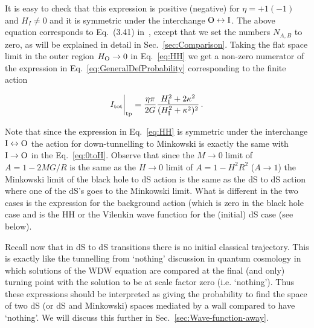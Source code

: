 \documentclass[11pt,a4paper]{article}
\begin{document}
It is easy to check that this expression is positive (negative) for $\eta = +1(-1)$ and $H_{I} \neq 0$ and it is symmetric under the interchange ${\rm O}\leftrightarrow {\rm I}$. The above equation corresponds to Eq.~(3.41) in~\cite{Bachlechner:2016mtp}, except that we set the numbers $N_{A,B}$ to zero, as will be explained in detail in Sec.~\ref{sec:Comparison}. Taking the flat space limit in the outer region $H_{\rm O} \rightarrow 0$ in Eq.~\eqref{eq:HH} we get a non-zero numerator of the expression in Eq.~\eqref{eq:GeneralDefProbability} corresponding to the finite action 

\begin{equation}
I_{\rm tot}\bigg|_{\rm tp} = \frac{\eta\pi}{2G}\frac{H_{{\rm I}}^{2}+2\kappa^{2}}{(H_{{\rm I}}^{2}+\kappa^{2})^{2}} \,.\label{eq:0toH}
\end{equation}

Note that since the expression in Eq.~\eqref{eq:HH} is symmetric under the interchange  ${\rm I}\leftrightarrow{\rm O}$ the action for down-tunnelling to Minkowski is exactly the same with ${\rm I}\rightarrow{\rm O}$ in the Eq.~\eqref{eq:0toH}. Observe that since the $M\rightarrow 0$ limit of $A=1-2MG/R$ is the same as the $H\rightarrow 0$ limit of $A=1-H^2R^2$ ($A \rightarrow 1$) the Minkowski limit of the black hole to dS action is the same as the dS to dS action where one of the dS's goes to the Minkowski limit. What is different in the two cases is the expression for the background action (which is zero in the black hole case and is the HH or the Vilenkin wave function for the (initial) dS case (see below). 

Recall now that in dS to dS transitions there is no initial classical trajectory. This is exactly like the tunnelling from `nothing' discussion in quantum cosmology in which solutions of the WDW equation are compared at the final (and only) turning point with the solution to be at scale factor zero (i.e. `nothing'). Thus these expressions should be interpreted as giving the probability to find the space of two dS (or dS and Minkowski) spaces mediated by a wall compared to have `nothing'. We will discuss this further in Sec.~\ref{sec:Wave-function-away}.
\end{document}

